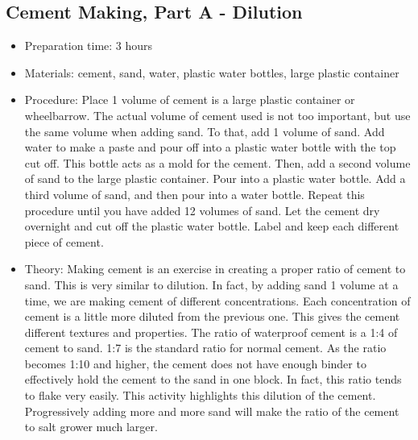 \subsection{Cement Making, Part A - Dilution}
\begin{itemize}
\item{Preparation time: 3 hours}
\item{Materials: cement, sand, water, plastic water bottles, large plastic container}
\item{Procedure: Place 1 volume of cement is a large plastic container or wheelbarrow. The actual volume of cement used is not too important, but use the same volume when adding sand. To that, add 1 volume of sand. Add water to make a paste and pour off into a plastic water bottle with the top cut off. This bottle acts as a mold for the cement. Then, add a second volume of sand to the large plastic container. Pour into a plastic water bottle. Add a third volume of sand, and then pour into a water bottle. Repeat this procedure until you have added 12 volumes of sand. Let the cement dry overnight and cut off the plastic water bottle. Label and keep each different piece of cement.}
\item{Theory: Making cement is an exercise in creating a proper ratio of cement to sand. This is very similar to dilution. In fact, by adding sand 1 volume at a time, we are making cement of different concentrations. Each concentration of cement is a little more diluted from the previous one. This gives the cement different textures and properties. The ratio of waterproof cement is a 1:4 of cement to sand. 1:7 is the standard ratio for normal cement. As the ratio becomes 1:10 and higher, the cement does not have enough binder to effectively hold the cement to the sand in one block. In fact, this ratio tends to flake very easily. This activity highlights this dilution of the cement. Progressively adding more and more sand will make the ratio of the cement to salt grower much larger.}
\end{itemize}

